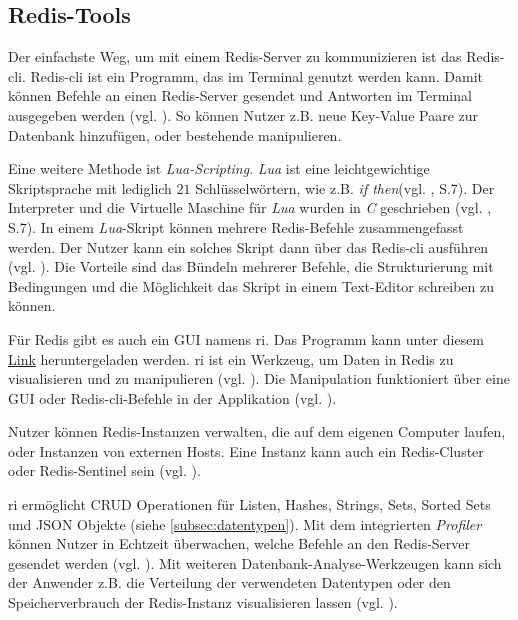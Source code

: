 
\subsection{Redis-Tools}

Der einfachste Weg, um mit einem \ac{Redis}-Server zu kommunizieren ist das \ac{Redis-cli}. \ac{Redis-cli} ist ein Programm, das im Terminal genutzt werden kann. Damit können Befehle an einen \ac{Redis}-Server gesendet und Antworten im Terminal ausgegeben werden (vgl. \cite{Redis-Docs-cli}). So können Nutzer z.B. neue Key-Value Paare zur Datenbank hinzufügen, oder bestehende manipulieren.

Eine weitere Methode ist \textit{Lua-Scripting}. \textit{Lua} ist eine leichtgewichtige Skriptsprache mit lediglich $21$ Schlüsselwörtern, wie z.B. \glqq \textit{if then}\grqq (vgl. \cite{17}, S.7). Der Interpreter und die Virtuelle Maschine für \textit{Lua} wurden in \textit{C} geschrieben (vgl. \cite{17}, S.7). In einem \textit{Lua}-Skript können mehrere \ac{Redis}-Befehle zusammengefasst werden. Der Nutzer kann ein solches Skript dann über das \ac{Redis-cli} ausführen (vgl. \cite{Redis-Docs-cli}). Die Vorteile sind das Bündeln mehrerer Befehle, die Strukturierung mit Bedingungen und die Möglichkeit das Skript in einem Text-Editor schreiben zu können.

Für \ac{Redis} gibt es auch ein \ac{GUI} namens \gls{ri}. Das Programm kann unter diesem \href{https://redis.com/redis-enterprise/redis-insight/?_gl=1*128mfio*_ga*OTc4MjQ4NDk1LjE3MDI2NjI1MzY.*_ga_8BKGRQKRPV*MTcwMjcxMzU2Ny4zLjEuMTcwMjcyMTEyNS42MC4wLjA.*_gcl_au*MTYxMzA5MjQ2MS4xNzAyNjYyNTM2&_ga=2.55945451.1702553176.1702662536-978248495.1702662536}{Link} heruntergeladen werden. \gls{ri} ist ein Werkzeug, um Daten in \ac{Redis} zu visualisieren und zu manipulieren (vgl. \cite{Redis-Docs-RI}). Die Manipulation funktioniert über eine \ac{GUI} oder \ac{Redis-cli}-Befehle in der Applikation (vgl. \cite{Redis-Docs-RI}). 

Nutzer können \ac{Redis}-Instanzen verwalten, die auf dem eigenen Computer laufen, oder Instanzen von externen Hosts. Eine Instanz kann auch ein \ac{Redis}-Cluster oder \ac{Redis}-Sentinel sein (vgl. \cite{Redis-Docs-RI}).

\gls{ri} ermöglicht \ac{CRUD} Operationen für Listen, Hashes, Strings, Sets, Sorted Sets und JSON Objekte (siehe \autoref{subsec:datentypen}). Mit dem integrierten \textit{Profiler} können Nutzer in Echtzeit überwachen, welche Befehle an den \ac{Redis}-Server gesendet werden (vgl. \cite{Redis-Docs-RI}). Mit weiteren Datenbank-Analyse-Werkzeugen kann sich der Anwender z.B. die Verteilung der verwendeten Datentypen oder den Speicherverbrauch der \ac{Redis}-Instanz visualisieren lassen (vgl. \cite{Redis-Docs-RI}).